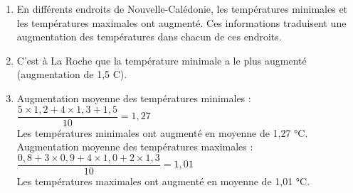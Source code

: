 
\begin{enumerate}
\item En différents endroits de Nouvelle-Calédonie, les températures minimales et les températures maximales ont augmenté. Ces informations traduisent une augmentation des températures dans chacun de ces endroits. 
\item C'est à La Roche que la température minimale a le plus augmenté \linebreak (augmentation de 1,5 \degres C). 
\item Augmentation moyenne des températures minimales : \\[2mm]
$\dfrac{5\times1,2+4\times1,3+1,5}{10}=1,27$ \\[2mm]
Les températures minimales ont augmenté en moyenne de 1,27 °C. \\
Augmentation moyenne des températures maximales : \\[2mm]
$\dfrac{0,8+3\times0,9+4\times1,0+2\times1,3}{10}=1,01$ \\[2mm]
Les températures maximales ont augmenté en moyenne de 1,01 °C.
\end{enumerate}


